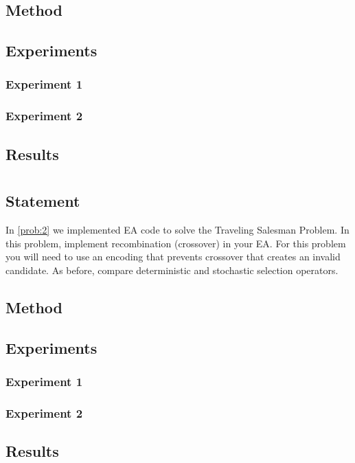 \documentclass{article}
\begin{document}
\subsection{Method}
\subsection{Experiments}
\subsubsection{Experiment 1}
\subsubsection{Experiment 2}

\subsection{Results}

\section{}\label{prob:3}
\subsection{Statement}
In \autoref{prob:2} we implemented EA code to solve the Traveling Salesman Problem. In this
problem, implement recombination (crossover) in your EA. For this problem you will need to use an
encoding that prevents crossover that creates an invalid candidate. As before, compare
deterministic and stochastic selection operators.

\subsection{Method}

\subsection{Experiments}

\subsubsection{Experiment 1}
\subsubsection{Experiment 2}

\subsection{Results}
\end{document}
